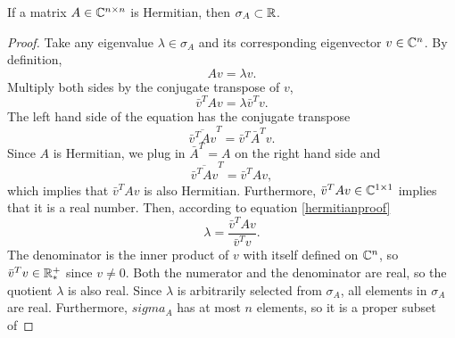 \begin{theorem}
If a matrix \(A\in\mathbb{C}^{n\times n}\) is Hermitian, then \(\sigma_A\subset\mathbb{R}\).
\end{theorem}
\begin{proof}
Take any eigenvalue \(\lambda\in\sigma_A\) and its corresponding eigenvector \(v\in\mathbb{C}^n\).
By definition,
\begin{equation}
Av=\lambda v.
\end{equation}
Multiply both sides by the conjugate transpose of $v$,
\begin{equation}\label{hermitianproof}
\bar{v}^T Av=\lambda \bar{v}^T v.
\end{equation}
The left hand side of the equation has the conjugate transpose
\begin{equation}
\overline{\bar{v}^T Av}^T=\bar{v}^T\bar{A}^T v.
\end{equation}
Since $A$ is Hermitian, we plug in \(\bar{A}^T=A\) on the right hand side and
\begin{equation}
\overline{\bar{v}^T Av}^T=\bar{v}^TA v,
\end{equation}
which implies that \(\bar{v}^T Av\) is also Hermitian.
Furthermore, \(\bar{v}^T Av\in\mathbb{C}^{1\times1}\) implies that it is a real number.
Then, according to equation \ref{hermitianproof}
\begin{equation}
\lambda=\frac{\bar{v}^T Av}{\bar{v}^T v}.
\end{equation}
The denominator is the inner product of $v$ with itself defined on \(\mathbb{C}^n\), so \(\bar{v}^T v\in\mathbb{R}_*^+\) since \(v\neq0\).
Both the numerator and the denominator are real, so the quotient $\lambda$ is also real.
Since $\lambda$ is arbitrarily selected from \(\sigma_A\), all elements in \(\sigma_A\) are real.
Furthermore, \(sigma_A\) has at most $n$ elements, so it is a proper subset of 
\end{proof}
